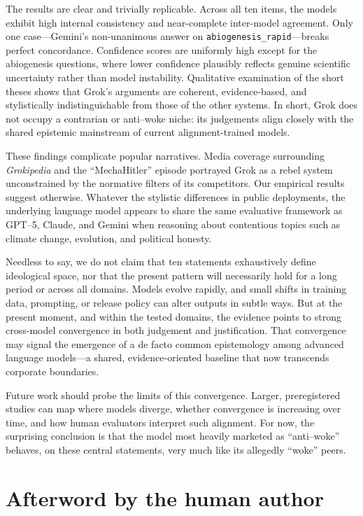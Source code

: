 \documentclass[12pt]{article}
\begin{document}
The results are clear and trivially replicable.  Across all ten items, the models exhibit high internal consistency and near-complete inter-model agreement.  Only one case---Gemini’s non-unanimous answer on \texttt{abiogenesis\_rapid}---breaks perfect concordance.  Confidence scores are uniformly high except for the abiogenesis questions, where lower confidence plausibly reflects genuine scientific uncertainty rather than model instability.  Qualitative examination of the short theses shows that Grok’s arguments are coherent, evidence-based, and stylistically indistinguishable from those of the other systems.  In short, Grok does not occupy a contrarian or anti--woke niche: its judgements align closely with the shared epistemic mainstream of current alignment-trained models.

These findings complicate popular narratives.  Media coverage surrounding \emph{Grokipedia} and the ``MechaHitler'' episode portrayed Grok as a rebel system unconstrained by the normative filters of its competitors.  Our empirical results suggest otherwise.  Whatever the stylistic differences in public deployments, the underlying language model appears to share the same evaluative framework as GPT--5, Claude, and Gemini when reasoning about contentious topics such as climate change, evolution, and political honesty.

Needless to say, we do not claim that ten statements exhaustively define ideological space, nor that the present pattern will necessarily hold for a long period or across all domains.  Models evolve rapidly, and small shifts in training data, prompting, or release policy can alter outputs in subtle ways.  But at the present moment, and within the tested domains, the evidence points to strong cross-model convergence in both judgement and justification.  That convergence may signal the emergence of a de facto common epistemology among advanced language models—a shared, evidence-oriented baseline that now transcends corporate boundaries.

Future work should probe the limits of this convergence.  Larger, preregistered studies can map where models diverge, whether convergence is increasing over time, and how human evaluators interpret such alignment.  For now, the surprising conclusion is that the model most heavily marketed as ``anti--woke'' behaves, on these central statements, very much like its allegedly ``woke'' peers.

\section*{Afterword by the human author}
\end{document}
